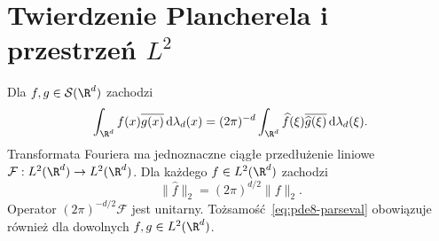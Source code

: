 \section[Twierdzenie Plancherela i przestrzeń L2]{Twierdzenie Plancherela i przestrzeń $L^2$}
\label{sec:pde8-plancherel}

\begin{twierdzenie}
\label{thm:pde8-plancherel}
Dla $f,g\in\mathcal S(\R^d)$ zachodzi
\begin{equation}\label{eq:pde8-parseval}
 \int_{\R^d}f(x)\overline{g(x)}\,\mathrm d\lambda_d(x)
 =(2\pi)^{-d}\int_{\R^d}\widehat f(\xi)
 \overline{\widehat g(\xi)}\,\mathrm d\lambda_d(\xi).
\end{equation}
Transformata Fouriera ma jednoznaczne ciągłe
przedłużenie liniowe
$\mathcal F:L^2(\R^d)\to L^2(\R^d)$.
Dla każdego $f\in L^2(\R^d)$ zachodzi
\[
 \|\widehat f\|_2=(2\pi)^{d/2}\|f\|_2.
\]
Operator $(2\pi)^{-d/2}\mathcal F$ jest unitarny.
Tożsamość~\eqref{eq:pde8-parseval} obowiązuje
również dla dowolnych $f,g\in L^2(\R^d)$.
\end{twierdzenie}
